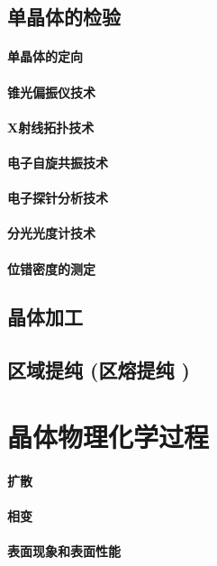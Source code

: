 \documentclass[UTF8]{../NatureUniverse}
\begin{document}
\section{单晶体的检验}
    \subsubsection{单晶体的定向}
    \subsubsection{锥光偏振仪技术}
    \subsubsection{X射线拓扑技术}
    \subsubsection{电子自旋共振技术}
    \subsubsection{电子探针分析技术}
    \subsubsection{分光光度计技术}
    \subsubsection{位错密度的测定}
\section{晶体加工}
\section{区域提纯 (区熔提纯 )}






\chapter{晶体物理化学过程}
\subsubsection{扩散}
\subsubsection{相变}
\subsubsection{表面现象和表面性能}
\end{document}

